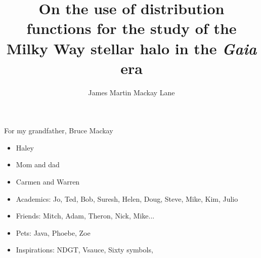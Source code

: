 \documentclass{ut-thesis}
\author{James Martin Mackay Lane}
\title{On the use of distribution functions for the study of the Milky Way stellar halo in the \textit{Gaia} era}
\begin{document}
\frontmatter
\maketitle

\begin{abstract}
    
\end{abstract}

\begin{dedication}
    For my grandfather, Bruce Mackay
\end{dedication}

\begin{acknowledgements}
    \begin{itemize}
        \item Haley
        \item Mom and dad
        \item Carmen and Warren
        \item Academics: Jo, Ted, Bob, Suresh, Helen, Doug, Steve, Mike, Kim, Julio
        \item Friends: Mitch, Adam, Theron, Nick, Mike...
        \item Pets: Java, Phoebe, Zoe
        \item Inspirations: NDGT, Vsauce, Sixty symbols, 
    \end{itemize}
\end{acknowledgements}

\tableofcontents
\listoftables
\listoffigures

\mainmatter






% 

% 

% 

\appendix

\backmatter
\printbibliography[heading=bibintoc]

\end{document}
